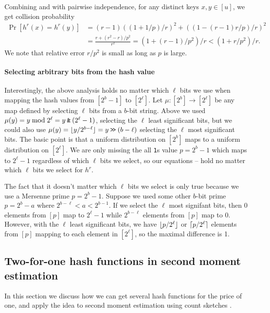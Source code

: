 Combining  and  with
pairwise independence, for any distinct keys $x,y\in [u]$, we get
collision probability
\begin{equation}\begin{split}  
   \Pr[h^r(x)=h^r(y)]
      &=(r-1)((1+1/p)/r)^2+((1-(r-1)r/p)/r)^2
      \\&= \frac{r +(r^2-r)/p^2}{r^2}
      =(1+(r-1)/p^2)/r
      <(1+r/p^2)/r.\label{eq:coll}
\end{split}\end{equation}
We note that relative error $r/p^2$ is small as long as $p$ is
large.

\paragraph{Selecting arbitrary bits from the hash value}
Interestingly, the above analysis holds no matter which $\ell$ bits we
use when mapping the hash values from $[2^b-1]$ to $[2^\ell]$.  Let
$\mu:[2^b]\to[2^\ell]$ be any map defined by selecting $\ell$ bits
from a $b$-bit string. Above we used
$\mu(y)=y\bmod 2^\ell=y\mathbin{\texttt{\&}}  (2^\ell-1)$,
selecting the $\ell$ least significant bits, but we could
also use $\mu(y)=\lfloor {y/2^{b-\ell}} \rfloor=y\mathbin{\texttt{>\!>}} (b-\ell)$ selecting
the $\ell$ most significant bits. The basic point is that a uniform
distribution on $[2^b]$ maps to a uniform distribution on
$[2^\ell]$. We are only missing the all \texttt1s value $p=2^b-1$ which maps to $2^\ell-1$
regardless of which $\ell$ bits we select, so our equations
-- hold no matter which $\ell$
bits we select for $h^r$.

The fact that it doesn't matter which $\ell$ bits we select is only
true because we use a Mersenne prime $p=2^b-1$. Suppose we used some
other $b$-bit prime $p=2^b-a$ where $2^{b-\ell}<a<2^{b-1}$. If we
select the $\ell$ most signifant bits, then $0$ elements from $[p]$
map to $2^\ell-1$ while $2^{b-\ell}$ elements from $[p]$ map to $0$. However,
with the $\ell$ least significant bits, we have $\lfloor {p/2^\ell} \rfloor$ or
$\lceil {p/2^\ell}\rceil$ elements from $[p]$ mapping to each element in
$[2^\ell]$, so the maximal difference is 1.


\subsection{Two-for-one hash functions in second moment estimation}
In this section we discuss how we can get several hash functions for
the price of one, and apply the idea to second moment estimation using
count sketches \cite{charikar04count-sketch}.

